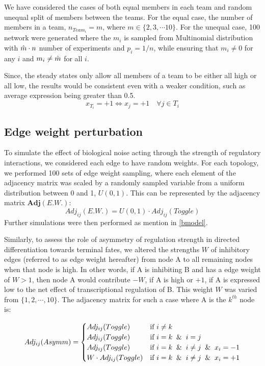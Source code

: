 \documentclass[11pt,a4paper]{article}
\theoremstyle{definition}
\theoremstyle{remark}
\begin{document}
We have considered the cases of both equal members in each team and random unequal split of members between the teams. For the equal case, the number of members in a team, $n_{Team_i} = m$, where $m \in \{2,3, \cdots 10\}$. For the unequal case, 100 network were generated where the $m_i$ is sampled from Multinomial distribution with $\Hat{m} \cdot n$ number of experiments and $p_i=1/n$, while ensuring that $m_i \neq 0$ for any $i$ and $m_i \neq \Hat{m}$ for all $i$.


Since, the steady states only allow all members of a team to be either all high or all low, the results would be consistent even with a weaker condition, such as average expression being greater than 0.5.
$$x_{T_i} = +1 \iff x_j = +1 \quad \forall j \in T_i$$

\subsection{Edge weight perturbation}

To simulate the effect of biological noise acting through the strength of regulatory interactions, we considered each edge to have random weights. For each topology, we performed 100 sets of edge weight sampling, where each element of the adjacency matrix was scaled by a randomly sampled variable from a uniform distribution between 0 and 1, $U(0,1)$. This can be represented by the adjacency matrix $\mathbf{Adj}(E.W.)$:
\begin{equation}
    Adj_{ij}(E.W.) = U(0,1) \cdot Adj_{ij}(Toggle)
\end{equation}
Further simulations were then performed as mention in \cref{bmodel}.

Similarly, to assess the role of asymmetry of regulation strength in directed differentiation towards terminal fates, we altered the strengths $W$ of inhibitory edges (referred to as edge weight hereafter) from node A to all remaining nodes when that node is high. In other words, if A is inhibiting B and has a edge weight of $W > 1$, then node A would contribute $-W$, if A is high or $+1$, if A is expressed low to the net effect of transcriptional regulation of B. This weight $W$ was varied from $\{1,2,\cdots,10\}$. The adjacency matrix for such a case where A is the $k^{th}$ node is:

\begin{equation}
    Adj_{ij}(Asymm) = \begin{cases}
      Adj_{ij}(Toggle) & \text{if $i \neq k$}\\
      Adj_{ij}(Toggle) & \text{if $i = k \And i = j$}\\
      Adj_{ij}(Toggle) & \text{if $i = k \And i \neq j \And x_i = -1$}\\
      W \cdot Adj_{ij}(Toggle) & \text{if $i = k \And i \neq j \And x_i = +1$}
    \end{cases}
    \label{asymm}
\end{equation}
\end{document}
